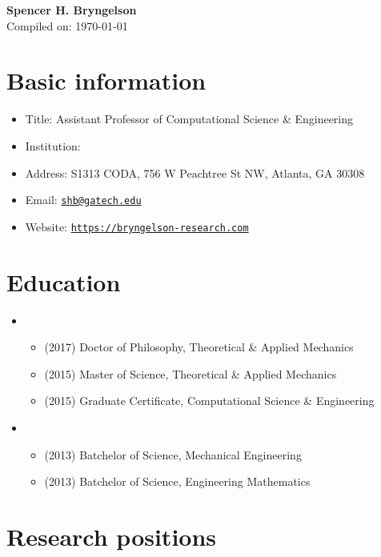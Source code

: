 



\begin{center}
    {\LARGE \bf Spencer H. Bryngelson} \\
    \medskip
    Compiled on: \today
\end{center}

\section{Basic information}
\begin{itemize}
    \item Title: Assistant Professor of Computational Science \& Engineering
    \item Institution: \GIT
    \item Address: S1313 CODA, 756 W Peachtree St NW, Atlanta, GA 30308
    \item Email: \href{mailto:shb@gatech.edu}{\texttt{shb@gatech.edu}}
    \item Website: \href{https://bryngelson-research.com}{\texttt{https://bryngelson-research.com}}
\end{itemize}

\section{Education}

\begin{itemize}
    \item \UIUC
    \begin{itemize}
        \item (2017) Doctor of Philosophy, Theoretical \& Applied Mechanics
        \item (2015) Master of Science, Theoretical \& Applied Mechanics
        \item (2015) Graduate Certificate, Computational Science \& Engineering
    \end{itemize}
    \item \UMD
    \begin{itemize}
        \item (2013) Batchelor of Science, Mechanical Engineering
        \item (2013) Batchelor of Science, Engineering Mathematics
    \end{itemize}
\end{itemize}


\section{Research positions}

